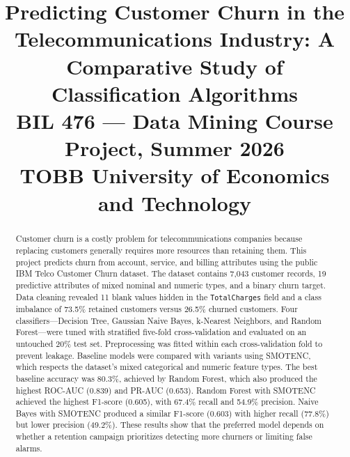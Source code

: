 \documentclass[conference]{IEEEtran}
\begin{document}
	
	\title{Predicting Customer Churn in the Telecommunications Industry: A Comparative Study of Classification Algorithms\\
		{\footnotesize BIL 476 --- Data Mining Course Project, Summer 2026\\
			TOBB University of Economics and Technology}
	}
	
	\author{
	}
	
	\maketitle
	
	\begin{abstract}
	Customer churn is a costly problem for telecommunications companies because replacing customers generally requires more resources than retaining them. This project predicts churn from account, service, and billing attributes using the public IBM Telco Customer Churn dataset. The dataset contains 7{,}043 customer records, 19 predictive attributes of mixed nominal and numeric types, and a binary churn target. Data cleaning revealed 11 blank values hidden in the \texttt{TotalCharges} field and a class imbalance of 73.5\% retained customers versus 26.5\% churned customers. Four classifiers---Decision Tree, Gaussian Naive Bayes, k-Nearest Neighbors, and Random Forest---were tuned with stratified five-fold cross-validation and evaluated on an untouched 20\% test set. Preprocessing was fitted within each cross-validation fold to prevent leakage. Baseline models were compared with variants using SMOTENC, which respects the dataset's mixed categorical and numeric feature types. The best baseline accuracy was 80.3\%, achieved by Random Forest, which also produced the highest ROC-AUC (0.839) and PR-AUC (0.653). Random Forest with SMOTENC achieved the highest F1-score (0.605), with 67.4\% recall and 54.9\% precision. Naive Bayes with SMOTENC produced a similar F1-score (0.603) with higher recall (77.8\%) but lower precision (49.2\%). These results show that the preferred model depends on whether a retention campaign prioritizes detecting more churners or limiting false alarms.
	\end{abstract}
	
\end{document}
